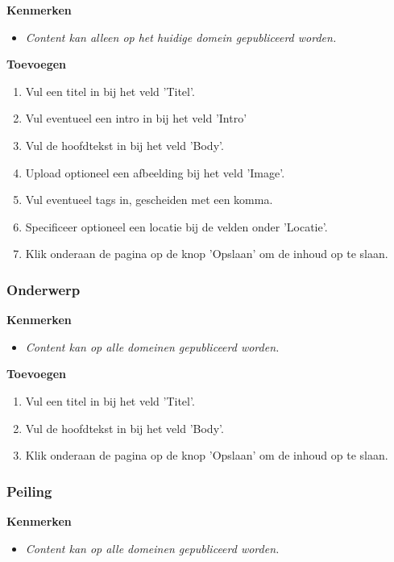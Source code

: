 \textbf{Kenmerken}

\begin{itemize}
\item \emph{Content kan alleen op het huidige domein gepubliceerd worden.}
\end{itemize}

\textbf{Toevoegen}

\begin{enumerate}
\item Vul een titel in bij het veld 'Titel'.
\item Vul eventueel een intro in bij het veld 'Intro'
\item Vul de hoofdtekst in bij het veld 'Body'.
\item Upload optioneel een afbeelding bij het veld 'Image'.
\item Vul eventueel tags in, gescheiden met een komma.
\item Specificeer optioneel een locatie bij de velden onder 'Locatie'.
\item Klik onderaan de pagina op de knop 'Opslaan' om de inhoud op te slaan.
\end{enumerate}

\subsubsection{Onderwerp}\label{onderwerp}

\textbf{Kenmerken}

\begin{itemize}
\item \emph{Content kan op alle domeinen gepubliceerd worden.}
\end{itemize}

\textbf{Toevoegen}

\begin{enumerate}
\item Vul een titel in bij het veld 'Titel'.
\item Vul de hoofdtekst in bij het veld 'Body'.
\item Klik onderaan de pagina op de knop 'Opslaan' om de inhoud op te slaan.
\end{enumerate}

\subsubsection{Peiling}\label{peiling}

\textbf{Kenmerken}

\begin{itemize}
\item \emph{Content kan op alle domeinen gepubliceerd worden.}
\end{itemize}

